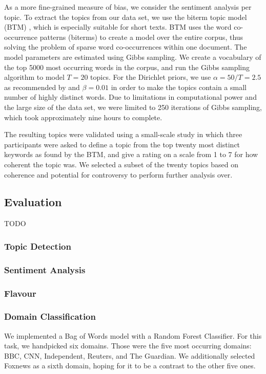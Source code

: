 \documentclass[final]{ieee}
\begin{document}
As a more fine-grained measure of bias, we consider the sentiment analysis per topic. To extract the topics from our data set, we use the biterm topic model (BTM) \cite{BTM13}, which is especially suitable for short texts. BTM uses the word co-occurrence patterns (biterms) to create a model over the entire corpus, thus solving the problem of sparse word co-occurrences within one document. The model parameters are estimated using Gibbs sampling. We create a vocabulary of the top 5000 most occurring words in the corpus, and run the Gibbs sampling algorithm to model $T = 20$ topics. For the Dirichlet priors, we use $\alpha = 50/T = 2.5$ as recommended by \cite{FST13} and $\beta = 0.01$ in order to make the topics contain a small number of highly distinct words. Due to limitations in computational power and the large size of the data set, we were limited to 250 iterations of Gibbs sampling, which took approximately nine hours to complete.

The resulting topics were validated using a small-scale study in which three participants were asked to define a topic from the top twenty most distinct keywords as found by the BTM, and give a rating on a scale from 1 to 7 for how coherent the topic was. We selected a subset of the twenty topics based on coherence and potential for controversy to perform further analysis over.

\subsection{Evaluation}
TODO


\subsubsection{Topic Detection}

\subsubsection{Sentiment Analysis}

\subsubsection{Flavour}

\subsubsection{Domain Classification}
We implemented a Bag of Words model with a Random Forest Classifier. For this task, we handpicked six domains. Those were the five most occurring domains: BBC, CNN, Independent, Reuters, and The Guardian. We additionally selected Foxnews as a sixth domain, hoping for it to be a contrast to the other five ones.
\end{document}
